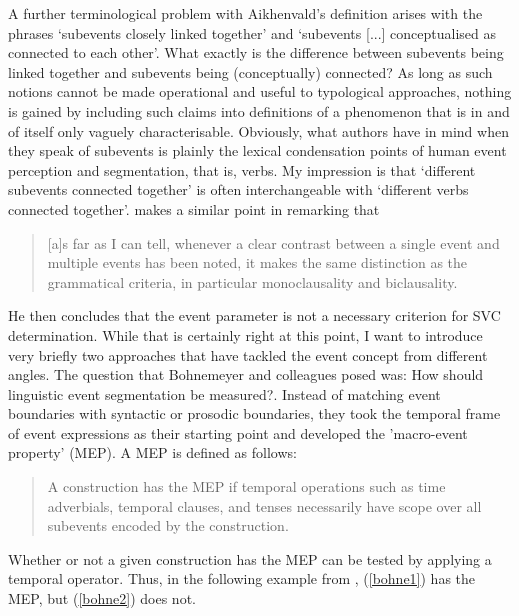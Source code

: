 A further terminological problem with Aikhenvald's definition arises with the phrases `subevents closely linked together' and `subevents [...] conceptualised as connected to each other'. What exactly is the difference between subevents being linked together and subevents being (conceptually) connected? As long as such notions cannot be made operational and useful to typological approaches, nothing is gained by including such claims into definitions of a phenomenon that is in and of itself only vaguely characterisable. Obviously, what authors have in mind when they speak of subevents is plainly the lexical condensation points of human event perception and segmentation, that is, verbs. My impression is that `different subevents connected together' is often interchangeable with `different verbs connected together'. \citet[15]{haspelmath2016serial} makes a similar point in remarking that

\begin{quote}[a]s far as I can tell, whenever a clear contrast between a single event and multiple events has been noted, it makes the same distinction as the grammatical criteria, in particular
monoclausality and biclausality.\end{quote}

He then concludes that the event parameter is not a necessary criterion for SVC determination. While that is certainly right at this point, I want to introduce very briefly two approaches that have tackled the event concept from different angles. The question that Bohnemeyer and colleagues \citep{bohnemeyer2007principles, bohnemeyer2011} posed was: How should linguistic event segmentation be measured?. Instead of matching event boundaries with syntactic or prosodic boundaries, they took the temporal frame of event expressions as their starting point and developed the 'macro-event property' (MEP). A MEP is defined as follows:

\begin{quote}A construction has the MEP if temporal operations such as time adverbials, temporal clauses, and tenses necessarily have scope over all subevents encoded by the construction. \citep[497]{bohnemeyer2007principles}\end{quote}

Whether or not a given construction has the MEP can be tested by applying a temporal operator. Thus, in the following example from \citet[503f.]{bohnemeyer2007principles}, (\ref{bohne1}) has the MEP, but (\ref{bohne2}) does not.

